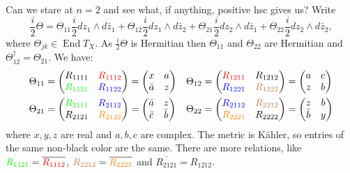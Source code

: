 \documentclass[11pt]{article}
\theoremstyle{definition}
\def\ov#1{\overline{#1}}
\DeclareMathOperator{\End}{End}
\begin{document}
Can we stare at $n = 2$ and see what, if anything, positive hsc gives us?
Write
$$
\frac i2 \Theta
= \Theta_{11} \frac i2 dz_1 \wedge d\bar z_1
+ \Theta_{12} \frac i2 dz_1 \wedge d\bar z_2
+ \Theta_{21} \frac i2 dz_2 \wedge d\bar z_1
+ \Theta_{22} \frac i2 dz_2 \wedge d\bar z_2,
$$
where $\Theta_{jk} \in \End T_X$.
As $\frac i2 \Theta$ is Hermitian then $\Theta_{11}$ and $\Theta_{22}$ are
Hermitian and $\Theta_{12}^\dagger = \Theta_{21}$.
We have:
\begin{align*}
\Theta_{11} &=
\begin{pmatrix}
R_{1111} & \color{red}{{R_{1112}}}
\\
\color{green}{R_{1121}} & \color{blue}{R_{1122}}
\end{pmatrix}
= \begin{pmatrix}
x & a
\\
\bar a & z
\end{pmatrix}
	    &
\Theta_{12} &=
\begin{pmatrix}
\color{red}{{R_{1211}}} & R_{1212}
\\
\color{blue}{R_{1221}} & \color{brown}{R_{1222}}
\end{pmatrix}
= \begin{pmatrix}
a & c
\\
z & b
\end{pmatrix}
\\
\Theta_{21} &=
\begin{pmatrix}
\color{green}{R_{2111}} & \color{blue}{R_{2112}}
\\
R_{2121} & \color{orange}{R_{2122}}
\end{pmatrix}
= \begin{pmatrix}
\bar a & z
\\
\bar c & \bar b
\end{pmatrix}
	    &
\Theta_{22} &=
\begin{pmatrix}
\color{blue}{R_{2112}} & \color{brown}{R_{2212}}
\\
\color{orange}{R_{2221}} & R_{2222}
\end{pmatrix}
= \begin{pmatrix}
z & b
\\
\bar b & y
\end{pmatrix}
\end{align*}
where $x,y,z$ are real and $a, b, c$ are complex.
The metric is K\"ahler, so entries of the same non-black color are the same.
There are more relations, like ${\color{green} R_{1121}} =
\ov{\color{red}{R_{1112}}}$,
${\color{brown} R_{2212}} = \ov{\color{orange} R_{2221}}$
and $\ov{R_{2121}} = R_{1212}$.
\end{document}
